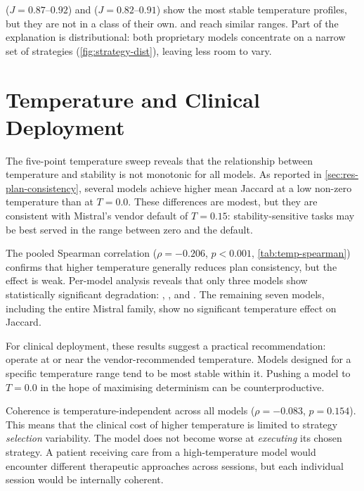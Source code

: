  ($J = 0.87$--$0.92$) and 
($J = 0.82$--$0.91$) show the most stable temperature profiles, but they
are not in a class of their own.  and
 reach similar ranges. Part of the
explanation is distributional: both proprietary models concentrate on a
narrow set of strategies (\autoref{fig:strategy-dist}), leaving less
room to vary.


\section{Temperature and Clinical Deployment}
\label{sec:disc-temperature}

The five-point temperature sweep reveals that the relationship between
temperature and stability is not monotonic for all models. As reported in
\autoref{sec:res-plan-consistency}, several models achieve higher mean
Jaccard at a low non-zero temperature than at $T = 0.0$. These
differences are modest, but they are consistent with Mistral's vendor
default of $T = 0.15$: stability-sensitive tasks may be best served in
the range between zero and the default.

The pooled Spearman correlation ($\rho = -0.206$, $p < 0.001$,
\autoref{tab:temp-spearman}) confirms that higher temperature generally
reduces plan consistency, but the effect is weak. Per-model analysis
reveals that only three models show statistically significant degradation: , ,
and . The remaining seven models, including the
entire Mistral family, show no significant temperature effect on Jaccard.

For clinical deployment, these results suggest a practical recommendation:
operate at or near the vendor-recommended temperature. Models designed for
a specific temperature range tend to be most stable within it. Pushing a
model to $T = 0.0$ in the hope of maximising determinism can be
counterproductive.

Coherence is temperature-independent across all models ($\rho = -0.083$,
$p = 0.154$). This means that the clinical cost of higher temperature is
limited to strategy \emph{selection} variability. The model does not become
worse at \emph{executing} its chosen strategy. A patient receiving care
from a high-temperature model would encounter different therapeutic
approaches across sessions, but each individual session would be internally
coherent.


